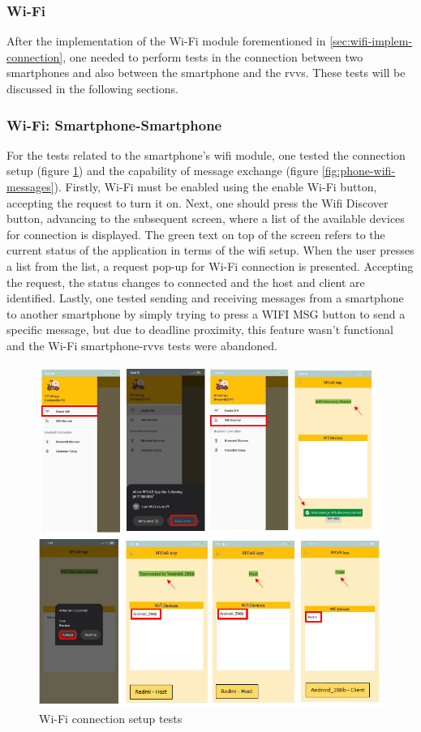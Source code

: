 \subsubsection{Wi-Fi}%
\label{sec:wifi-test}
%
After the implementation of the Wi-Fi module forementioned in \ref{sec:wifi-implem-connection}, one needed to perform tests in the connection between two smartphones and also between the smartphone and the \gls{rvvs}. These tests will be discussed in the following sections. 
%
\subsubsection{Wi-Fi: Smartphone-Smartphone}
\label{sec:wifi-phone-phone}
%
For the tests related to the smartphone's wifi module, one tested the connection setup (figure \ref{fig:phone-wifi-setup}) and the capability of message exchange (figure \ref{fig:phone-wifi-messages}). Firstly, Wi-Fi must be enabled using the enable Wi-Fi button, accepting the request to turn it on. Next, one should press the Wifi Discover button, advancing to the subsequent screen, where a list of the available devices for connection is displayed. The green text on top of the screen refers to the current status of the application in terms of the wifi setup. When the user presses a list from the list, a request pop-up for Wi-Fi connection is presented. Accepting the request, the status changes to connected and the host and client are identified. Lastly, one tested sending and receiving messages from a smartphone to another smartphone by simply trying to press a WIFI MSG button to send a specific message, but due to deadline proximity, this feature wasn't functional and the Wi-Fi smartphone-\gls{rvvs} tests were abandoned. 
%
\begin{figure}[!ht]
\centering
\includegraphics[width=\textwidth]{img/phone-wifi-setup.png}
\caption{\label{fig:phone-wifi-setup}Wi-Fi connection setup tests}
\end{figure}
